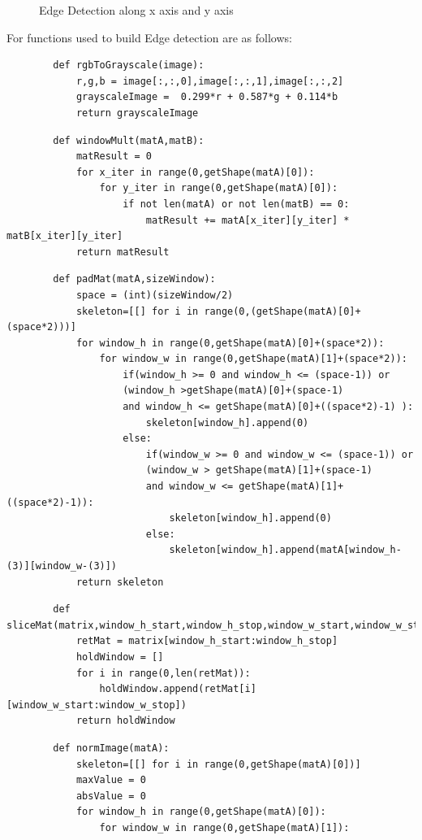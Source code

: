 \documentclass[12pt]{article}
\newenvironment{QandA}
{
	\begin{enumerate}[label=\normalfont\arabic*.,leftmargin=2em,rightmargin=2em]\normalfont
	}
	{
	\end{enumerate}
}
\newenvironment{codelalala}{}{}
\newenvironment{answered}{\setlength{\parindent}{1em}\par\normalfont}{}
\begin{document}
\begin{QandA}
\begin{answered}
\begin{figure}
  			\caption{Edge Detection along x axis and y axis }
  		\label{edge-detection}
\end{figure}
		For functions used to build Edge detection are as follows:
		\begin{codelalala}
		\begin{verbatim}
		def rgbToGrayscale(image):
    		r,g,b = image[:,:,0],image[:,:,1],image[:,:,2]
    		grayscaleImage =  0.299*r + 0.587*g + 0.114*b
    		return grayscaleImage
    	\end{verbatim}
		\begin{verbatim}
		def windowMult(matA,matB):
    		matResult = 0
    		for x_iter in range(0,getShape(matA)[0]):
        		for y_iter in range(0,getShape(matA)[0]):
            		if not len(matA) or not len(matB) == 0:
                		matResult += matA[x_iter][y_iter] * matB[x_iter][y_iter]
    		return matResult
		\end{verbatim}
		\begin{verbatim}
		def padMat(matA,sizeWindow):
    		space = (int)(sizeWindow/2)
    		skeleton=[[] for i in range(0,(getShape(matA)[0]+(space*2)))]
    		for window_h in range(0,getShape(matA)[0]+(space*2)):
        		for window_w in range(0,getShape(matA)[1]+(space*2)):
            		if(window_h >= 0 and window_h <= (space-1)) or 
            		(window_h >getShape(matA)[0]+(space-1) 
            		and window_h <= getShape(matA)[0]+((space*2)-1) ):
                		skeleton[window_h].append(0)
            		else:
                		if(window_w >= 0 and window_w <= (space-1)) or 
                		(window_w > getShape(matA)[1]+(space-1)
                	 	and window_w <= getShape(matA)[1]+((space*2)-1)):
                    		skeleton[window_h].append(0)
               			else:
                    		skeleton[window_h].append(matA[window_h-(3)][window_w-(3)])
    		return skeleton
		\end{verbatim}
		\begin{verbatim}
		def sliceMat(matrix,window_h_start,window_h_stop,window_w_start,window_w_stop):
    		retMat = matrix[window_h_start:window_h_stop]
    		holdWindow = []
    		for i in range(0,len(retMat)):
        		holdWindow.append(retMat[i][window_w_start:window_w_stop])
    		return holdWindow
		\end{verbatim}
		\begin{verbatim}
		def normImage(matA):
    		skeleton=[[] for i in range(0,getShape(matA)[0])]
    		maxValue = 0
    		absValue = 0
		    for window_h in range(0,getShape(matA)[0]):
		        for window_w in range(0,getShape(matA)[1]):

\end{verbatim}
\end{codelalala}
\end{answered}
\end{QandA}
\end{document}
